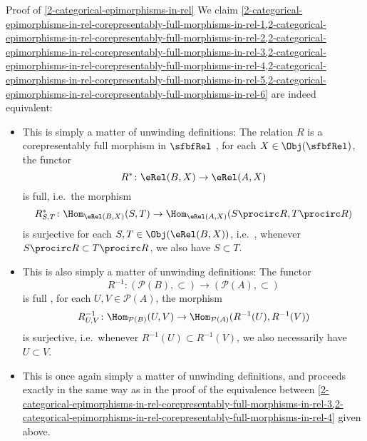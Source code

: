 \begin{Proof}{Proof of \cref{2-categorical-epimorphisms-in-rel}}
    We claim \cref{2-categorical-epimorphisms-in-rel-corepresentably-full-morphisms-in-rel-1,2-categorical-epimorphisms-in-rel-corepresentably-full-morphisms-in-rel-2,2-categorical-epimorphisms-in-rel-corepresentably-full-morphisms-in-rel-3,2-categorical-epimorphisms-in-rel-corepresentably-full-morphisms-in-rel-4,2-categorical-epimorphisms-in-rel-corepresentably-full-morphisms-in-rel-5,2-categorical-epimorphisms-in-rel-corepresentably-full-morphisms-in-rel-6} are indeed equivalent:
    \begin{itemize}
        \item{}This is simply a matter of unwinding definitions: The relation $R$ is a corepresentably full morphism in $\sfbfRel$ \textiff, for each $X\in\Obj(\sfbfRel)$, the functor
            \[
                R^{*}%
                \colon%
                \eRel(B,X)%
                \to%
                \eRel(A,X)%
            \]%
            is full, i.e.\ \textiff the morphism
            \[
                R^{*}_{S,T}%
                \colon%
                \Hom_{\eRel(B,X)}(S,T)%
                \to%
                \Hom_{\eRel(A,X)}(S\procirc R,T\procirc R)%
            \]%
            is surjective for each $S,T\in\Obj(\eRel(B,X))$, i.e.\ \textiff, whenever $S\procirc R\subset T\procirc R$, we also have $S\subset T$.
        \item{}This is also simply a matter of unwinding definitions: The functor
            \[
                R^{-1}%
                \colon%
                (\mathcal{P}(B),\subset)%
                \to%
                (\mathcal{P}(A),\subset)%
            \]%
            is full \textiff, for each $U,V\in\mathcal{P}(A)$, the morphism
            \[
                R^{-1}_{U,V}%
                \colon%
                \Hom_{\mathcal{P}(B)}(U,V)%
                \to%
                \Hom_{\mathcal{P}(A)}(R^{-1}(U),R^{-1}(V))%
            \]%
            is surjective, i.e.\ \textiff whenever $R^{-1}(U)\subset R^{-1}(V)$, we also necessarily have $U\subset V$.
        \item{}This is once again simply a matter of unwinding definitions, and proceeds exactly in the same way as in the proof of the equivalence between \cref{2-categorical-epimorphisms-in-rel-corepresentably-full-morphisms-in-rel-3,2-categorical-epimorphisms-in-rel-corepresentably-full-morphisms-in-rel-4} given above.

\end{itemize}
\end{Proof}
